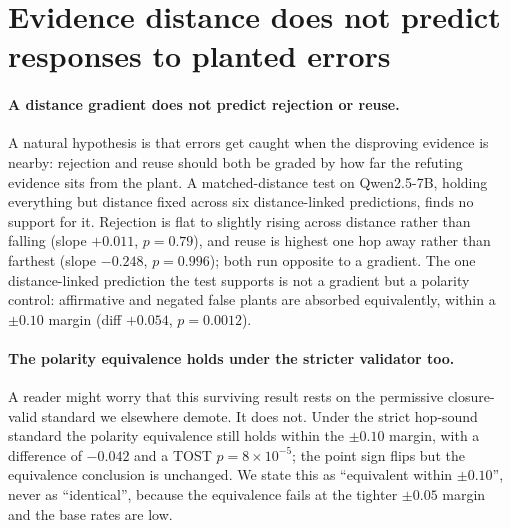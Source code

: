\section{Evidence distance does not predict responses to planted errors}
\label{sec:reversal}


\paragraph{A distance gradient does not predict rejection or reuse.} A natural
hypothesis is that errors get caught when the disproving evidence is nearby:
rejection and reuse should both be graded by how far the refuting evidence
sits from the plant. A matched-distance test on Qwen2.5-7B, holding everything
but distance fixed across six distance-linked predictions, finds no support
for it. Rejection is flat to slightly rising across distance rather than
falling (slope $+0.011$, $p{=}0.79$), and reuse is highest one hop away rather
than farthest (slope $-0.248$, $p{=}0.996$); both run opposite to a gradient.
The one distance-linked prediction the test supports is not a gradient but a
polarity control: affirmative and negated false plants are absorbed
equivalently, within a $\pm0.10$ margin (diff $+0.054$, $p{=}0.0012$).

\paragraph{The polarity equivalence holds under the stricter validator too.} A
reader might worry that this surviving result rests on the permissive
closure-valid standard we elsewhere demote. It does not. Under the strict
hop-sound standard the polarity equivalence still holds within the
$\pm0.10$ margin, with a difference of $-0.042$ and a TOST
$p{=}8\times10^{-5}$; the point sign flips but the equivalence conclusion is
unchanged.
We state this as ``equivalent within $\pm0.10$'', never as ``identical'',
because the equivalence fails at the tighter $\pm0.05$ margin and the base
rates are low.

